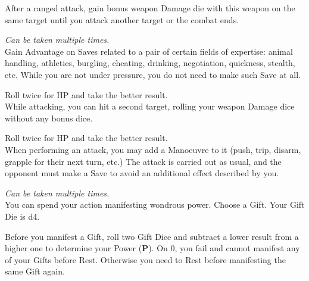 \documentclass[itdr]{subfiles}
\begin{document}
\vfill
{}
After a ranged attack, gain bonus weapon Damage die with this weapon on the same target until you attack another target or the combat ends.

\vfill
{} {\slshape Can be taken multiple times.}\\
Gain Advantage on Saves related to a pair of certain fields of expertise: animal handling, athletics, burgling, cheating, drinking, negotiation, quickness, stealth, etc. While you are not under pressure, you do not need to make such Save at all.

\vfill
{} Roll twice for HP and take the better result.\\
While attacking, you can hit a second target, rolling your weapon Damage dice without any bonus dice.

\vfill
{}
 Roll twice for HP and take the better result.\\
When performing an attack, you may add a Manoeuvre to it (push, trip, disarm, grapple for their next turn, etc.) The attack is carried out as usual, and the opponent must make a Save to avoid an additional effect described by you.

\vfill
{}
 {\slshape Can be taken multiple times.}\\
You can spend your action manifesting wondrous power. Choose a Gift. Your Gift Die is d4.

Before you manifest a Gift, roll two Gift Dice and subtract a lower result from a higher one to determine your Power (\textbf{P}). On 0, you fail and cannot manifest any of your Gifts before Rest. Otherwise you need to Rest before manifesting the same Gift again.
\end{document}
